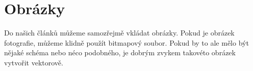 \documentclass[a4paper,11pt]{article}
\begin{document}
\section{Obrázky}
Do našich článků můžeme samozřejmě vkládat obrázky. Pokud je obrázek fotografie, můžeme klidně použít bitmapový
soubor. Pokud by to ale mělo být nějaké schéma nebo néco podobného, je dobrým zvykem takovéto
obrázek vytvořit vektorově.

\begin{figure}[h]
\centering
\end{figure}
\end{document}
